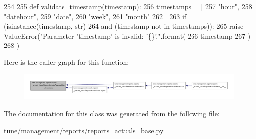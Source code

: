 \begin{DoxyCode}
254 
255     \textcolor{keyword}{def }\hyperlink{classtune_1_1management_1_1reports_1_1reports__actuals__base_1_1ReportsActualsBase_a2808fb349b9515465dab9d2c1e12cafd}{validate\_timestamp}(timestamp):
256         timestamps = [
257             \textcolor{stringliteral}{"hour"},
258             \textcolor{stringliteral}{"datehour"},
259             \textcolor{stringliteral}{"date"},
260             \textcolor{stringliteral}{"week"},
261             \textcolor{stringliteral}{"month"}
262         ]
263         \textcolor{keywordflow}{if} (isinstance(timestamp, str)
264             \textcolor{keywordflow}{and} (timestamp \textcolor{keywordflow}{not} \textcolor{keywordflow}{in} timestamps)):
265             \textcolor{keywordflow}{raise} ValueError(\textcolor{stringliteral}{"Parameter 'timestamp' is invalid: '\{\}'."}.format(
266                 timestamp
267                 )
268             )
\end{DoxyCode}


Here is the caller graph for this function\-:
\nopagebreak
\begin{figure}[H]
\begin{center}
\leavevmode
\includegraphics[width=350pt]{classtune_1_1management_1_1reports_1_1reports__actuals__base_1_1ReportsActualsBase_a2808fb349b9515465dab9d2c1e12cafd_icgraph}
\end{center}
\end{figure}




The documentation for this class was generated from the following file\-:\begin{DoxyCompactItemize}
\item 
tune/management/reports/\hyperlink{reports__actuals__base_8py}{reports\-\_\-actuals\-\_\-base.\-py}\end{DoxyCompactItemize}
